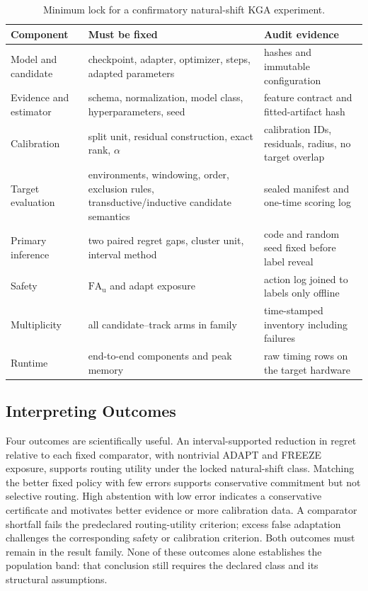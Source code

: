 \begin{table}[!t]
\centering
\scriptsize
\caption{Minimum lock for a confirmatory natural-shift KGA experiment.}
\label{tab:compact-confirm-lock}
\begin{tabular}{@{}p{}p{}p{}@{}}
\toprule
Component & Must be fixed & Audit evidence \\
\midrule
Model and candidate & checkpoint, adapter, optimizer, steps, adapted parameters & hashes and immutable configuration \\
Evidence and estimator & schema, normalization, model class, hyperparameters, seed & feature contract and fitted-artifact hash \\
Calibration & split unit, residual construction, exact rank, $\alpha$ & calibration IDs, residuals, radius, no target overlap \\
Target evaluation & environments, windowing, order, exclusion rules, transductive/inductive candidate semantics & sealed manifest and one-time scoring log \\
Primary inference & two paired regret gaps, cluster unit, interval method & code and random seed fixed before label reveal \\
Safety & $\mathrm{FA}_{\mathrm u}$ and adapt exposure & action log joined to labels only offline \\
Multiplicity & all candidate--track arms in family & time-stamped inventory including failures \\
Runtime & end-to-end components and peak memory & raw timing rows on the target hardware \\
\bottomrule
\end{tabular}
\end{table}

\subsection{Interpreting Outcomes}

Four outcomes are scientifically useful. An interval-supported reduction in regret relative to each
fixed comparator, with nontrivial ADAPT and FREEZE exposure, supports routing utility under the
locked natural-shift class. Matching the better fixed policy with few errors supports conservative
commitment but not selective routing. High abstention with low error indicates a conservative
certificate and motivates better evidence or more calibration data. A comparator shortfall fails
the predeclared routing-utility criterion; excess false adaptation challenges the corresponding
safety or calibration criterion. Both outcomes must remain in the result family. None of these
outcomes alone establishes the
population band: that conclusion still requires the declared class and its structural assumptions.

